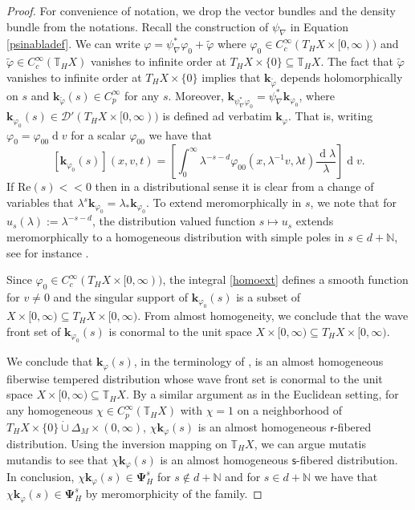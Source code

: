 \documentclass[a4paper,reqno]{amsart}
\numberwithin{equation}{section}
\def\rd{\operatorname{d}\!}
\def\N{\mathbb{N}}
\def\T{\mathbb{T}}
\theoremstyle{definition}
\theoremstyle{remark}
\begin{document}
\begin{proof}
For  convenience of notation, we drop the vector bundles and the density bundle from the notations. Recall the construction of $\psi_\nabla$ in Equation \eqref{psinabladef}. We can write $\varphi=\psi^*_\nabla\varphi_0+\tilde{\varphi}$ where $\varphi_0\in C^\infty_c(T_HX\times[0,\infty))$ and $\tilde{\varphi}\in C^\infty_c(\T_HX)$ vanishes to infinite order at $T_HX\times \{0\}\subseteq \T_HX$. The fact that $\tilde{\varphi}$ vanishes to infinite order at $T_HX\times \{0\}$ implies that $\pmb{k}_{\tilde{\varphi}}$ depends holomorphically on $s$ and $\pmb{k}_{\tilde{\varphi}}(s)\in C^\infty_p$ for any $s$. Moreover, $\pmb{k}_{\psi^*_\nabla\varphi_0}=\psi^*_\nabla\pmb{k}_{\varphi_0}$, where $\pmb{k}_{\varphi_0}(s)\in \mathcal{D}'(T_HX\times [0,\infty))$ is defined ad verbatim $\pmb{k}_{\varphi}$. That is, writing $\varphi_0=\varphi_{00}\rd v$ for a scalar $\varphi_{00}$ we have that
\begin{equation}
\label{homoext}
[\pmb{k}_{\varphi_0}(s)](x,v,t)=\left[\int_0^\infty \lambda^{-s-d}\varphi_{00}(x,\lambda^{-1} v,\lambda t) \frac{\rd \lambda}{\lambda}\right] \rd v.
\end{equation}
If $\mathrm{Re}(s)<<0$ then in a distributional sense it is clear from a change of variables that $\lambda^s\pmb{k}_{\varphi_0}=\lambda_*\pmb{k}_{\varphi_0}$. To extend meromorphically in $s$, we note that for $u_s(\lambda):= \lambda^{-s-d}$, the distribution valued function $s\mapsto u_s$ extends meromorphically to a homogeneous distribution with simple poles in $s\in d+\N$, see for instance \cite{horI}.

Since $\varphi_0\in C^\infty_c(T_HX\times[0,\infty))$, the integral \eqref{homoext} defines a smooth function for $v\neq 0$ and the singular support of $\pmb{k}_{\varphi_0}(s)$ is a subset of $X\times [0,\infty)\subseteq T_HX\times[0,\infty)$. From almost homogeneity, we conclude that the wave front set of $\pmb{k}_{\varphi_0}(s)$ is conormal to the unit space $X\times [0,\infty)\subseteq T_HX\times[0,\infty)$.



We conclude that $\pmb{k}_{\varphi}(s)$, in the terminology of \cite[Chapter 9]{ewertthesis}, is an almost homogeneous fiberwise tempered distribution whose wave front set  is conormal to the unit space $X\times [0,\infty)\subseteq \T_HX$. By a similar argument as in the Euclidean setting, for any homogeneous $\chi\in C^\infty_p(\T_HX)$ with $\chi=1$ on a neighborhood of $T_HX\times \{0\}\dot{\cup}\Delta_M\times (0,\infty)$, $\chi\pmb{k}_{\varphi}(s)$ is an almost homogeneous $\mathsf{r}$-fibered distribution. Using the inversion mapping on $\T_HX$, we can argue mutatis mutandis to see that $\chi\pmb{k}_{\varphi}(s)$ is an almost homogeneous $\mathsf{s}$-fibered distribution. In conclusion, $\chi\pmb{k}_{\varphi}(s)\in \pmb{\Psi}^s_H$ for $s\notin d+\mathbb{N}$ and for $s\in d+\N$ we have that $\chi\pmb{k}_{\varphi}(s)\in \pmb{\Psi}^s_H$ by meromorphicity of the family.  
\end{proof}
\end{document}
